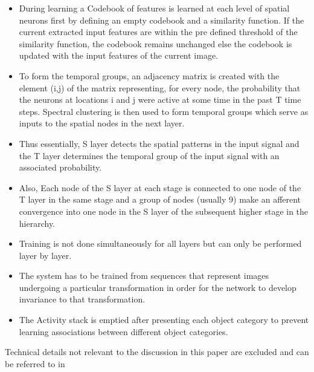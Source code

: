 \documentclass[12pt,twoside]{article}
\theoremstyle{plain}
\theoremstyle{definition}
\theoremstyle{remark}
\begin{document}
\begin{itemize}
\item During learning a Codebook of features is learned at each level of spatial neurons first by defining an empty codebook and a similarity function. If the current extracted input features are within the pre defined threshold of the similarity function, the codebook remains unchanged else the codebook is updated with the input features of the current image. 
\item To form the temporal groups, an adjacency matrix is created with the element (i,j) of the matrix representing, for every node, the probability that the neurons at locations i and j were active at some time in the past T time steps. Spectral clustering\cite{UlrikevonLuxburg2004} is then used to form temporal groups which serve as inputs to the spatial nodes in the next layer. 
\item Thus essentially, S layer detects the spatial patterns in the input signal and the T layer determines the temporal group of the input signal with an associated probability. 
\item Also, Each node\cite{MarkusLessmann2014} of the S layer at each stage is connected to one node of the T layer in the same stage and a group of nodes (usually 9) make an afferent convergence into one node in the S layer of the subsequent higher stage in the hierarchy. 
\item Training is not done simultaneously for all layers but can only be performed layer by layer.
\item The system has to be trained from sequences that represent images undergoing a particular transformation in order for the network to develop invariance to that transformation. 
\item The Activity stack is emptied after presenting each object category to prevent learning associations between different object categories.

\end{itemize} 	
Technical details not relevant to the discussion in this paper are excluded and can be referred to in \cite{MarkusLessmann2014}
\end{document}
